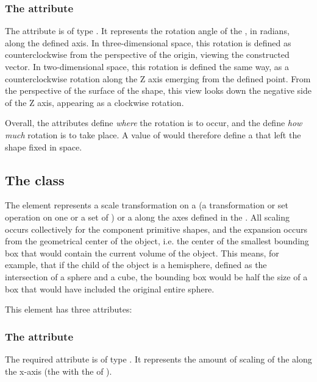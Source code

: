\subsubsection{The \fixttspace{} attribute}
The  attribute is of type . It represents the rotation angle of the \CSGNode, in radians, along the defined axis.  In three-dimensional space, this rotation is defined as counterclockwise from the perspective of the origin, viewing the constructed vector.  In two-dimensional space, this rotation is defined the same way, as a counterclockwise rotation along the Z axis emerging from the defined point.  From the perspective of the surface of the shape, this view looks down the negative side of the Z axis, appearing as a clockwise rotation.

Overall, the  attributes define \emph{where} the rotation is to occur, and the  define \emph{how much} rotation is to take place.  A  value of  would therefore define a \CSGRotation that left the shape fixed in space.


\subsection{The  class}
\label{csgscale-class}
The \CSGScale element represents a scale transformation on a \CSGNode (a transformation or set operation on one or a set of \CSGPrimitives) or a \CSGPrimitive along the axes defined in the \Geometry.  All scaling occurs collectively for the component primitive shapes, and the expansion occurs from the geometrical center of the object, i.e. the center of the smallest bounding box that would contain the current volume of the object.  This means, for example, that if the child of the \CSGScale object is a hemisphere, defined as the intersection of a sphere and a cube, the bounding box would be half the size of a box that would have included the original entire sphere.

This element has three attributes:

\subsubsection{The \fixttspace{} attribute}
The  required attribute is of type . It represents the amount of scaling of the \CSGNode along the x-axis (the \CoordinateComponent with the  of ).

